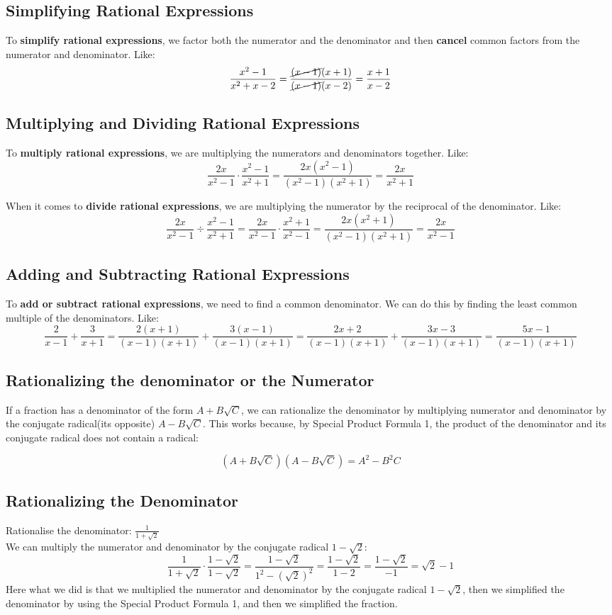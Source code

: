 \subsection{Simplifying Rational Expressions}
To \textbf{simplify rational expressions}, we factor both the numerator and the denominator and then \textbf{cancel} common factors from the numerator and denominator.
Like: $$ \frac{x^2-1}{x^2+x-2} = \frac{\cancel{(x-1)}(x+1)}{\cancel{(x-1)}(x-2)}=\frac{x+1}{x-2}$$


\subsection{Multiplying and Dividing Rational Expressions}
To \textbf{multiply rational expressions}, we are multiplying the numerators and denominators together. Like: $$ \frac{2x}{x^2-1} \cdot \frac{x^2-1}{x^2+1} = \frac{2x(x^2-1)}{(x^2-1)(x^2+1)} = \frac{2x}{x^2+1}$$ 

When it comes to \textbf{divide rational expressions}, we are multiplying the numerator by the reciprocal of the denominator. Like: $$ \frac{2x}{x^2-1} \div \frac{x^2-1}{x^2+1} = \frac{2x}{x^2-1} \cdot \frac{x^2+1}{x^2-1} = \frac{2x(x^2+1)}{(x^2-1)(x^2+1)} = \frac{2x}{x^2-1}$$

\subsection{Adding and Subtracting Rational Expressions}
To \textbf{add or subtract rational expressions}, we need to find a common denominator. We can do this by finding the least common multiple of the denominators. Like: $$ \frac{2}{x-1} + \frac{3}{x+1} = \frac{2(x+1)}{(x-1)(x+1)} + \frac{3(x-1)}{(x-1)(x+1)} = \frac{2x+2}{(x-1)(x+1)} + \frac{3x-3}{(x-1)(x+1)} = \frac{5x-1}{(x-1)(x+1)}$$

\subsection{Rationalizing the denominator or the Numerator}
If a fraction has a denominator of the form $A+B\sqrt{C}$, we can rationalize the denominator by multiplying numerator and denominator by the conjugate radical(its opposite) $A-B\sqrt{C}$.
This works because, by Special Product Formula 1, the product of the
denominator and its conjugate radical does not contain a radical:

$$ (A+B\sqrt{C})(A-B\sqrt{C})=A^2-B^2C$$

\subsection{Rationalizing the Denominator}
Rationalise the denominator: $\displaystyle \frac{1}{1+\sqrt{2}}$ \\ \break
We can multiply the numerator and denominator by the conjugate radical $1-\sqrt{2}$:
$$ \frac{1}{1+\sqrt{2}} \cdot \frac{1-\sqrt{2}}{1-\sqrt{2}} = \frac{1-\sqrt{2}}{1^2-(\sqrt{2})^2} = \frac{1-\sqrt{2}}{1-2} = \frac{1-\sqrt{2}}{-1} = \sqrt{2}-1$$
Here what we did is that we multiplied the numerator and denominator by the conjugate radical $1-\sqrt{2}$, then we simplified the denominator by using the Special Product Formula 1, and then we simplified the fraction.


